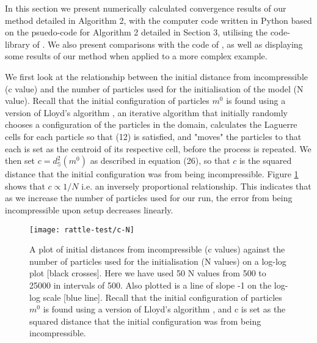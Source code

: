 \documentclass[11pt, oneside]{article}   	%
\begin{document}
In this section we present numerically calculated convergence results of our method detailed in Algorithm 2, with the computer code written in Python based on the psuedo-code for Algorithm 2 detailed in Section 3, utilising the code-library of \cite{gallouet2016lagrangian} \citep{merigotpymongeampere}. We also present comparisons with the code of \cite{gallouet2016lagrangian}, as well as displaying some results of our method when applied to a more complex example.

We first look at the relationship between the initial distance from incompressible (c value) and the number of particles used for the initialisation of the model (N value). Recall that the initial configuration of particles \(m^0\) is found using a version of Lloyd's algorithm \citep{merigot2017algorithm}, an iterative algorithm that initially randomly chooses a configuration of the particles in the domain, calculates the Laguerre cells for each particle so that (12) is satisfied, and "moves" the particles to that each is set as the centroid of its respective cell, before the process is repeated. We then set \(c = d^{2}_{\mathbb{S}}(m^{0})\) as described in equation (26), so that \(c\) is the squared distance that the initial configuration was from being incompressible. Figure \ref{fig:c-N} shows that \(c \propto 1/N\) i.e. an inversely proportional relationship. This indicates that as we increase the number of particles used for our run, the error from being incompressible upon setup decreases linearly.

\begin{figure}[H]
\texttt{[image: rattle-test/c-N]}
\centering
\caption{A plot of initial distances from incompressible (c values) against the number of particles used for the initialisation (N values) on a log-log plot [black crosses]. Here we have used 50 N values from 500 to 25000 in intervals of 500. Also plotted is a line of slope -1 on the log-log scale [blue line]. Recall that the initial configuration of particles \(m^0\) is found using a version of Lloyd's algorithm \citep{merigot2017algorithm}, and c is set as the squared distance that the initial configuration was from being incompressible. }
\centering
\label{fig:c-N}
\end{figure}
\end{document}

